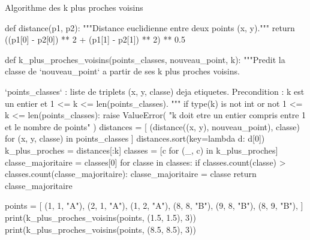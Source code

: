 \begin{codereference}{Algorithme des k plus proches voisins}
\begin{python}
def distance(p1, p2):
    """Distance euclidienne entre deux points (x, y)."""
    return ((p1[0] - p2[0]) ** 2 + (p1[1] - p2[1]) ** 2) ** 0.5


def k_plus_proches_voisins(points_classes, nouveau_point, k):
    """Predit la classe de `nouveau_point` a partir de ses k plus proches voisins.

    `points_classes` : liste de triplets (x, y, classe) deja etiquetes.
    Precondition : k est un entier et 1 <= k <= len(points_classes).
    """
    if type(k) is not int or not 1 <= k <= len(points_classes):
        raise ValueError(
            "k doit etre un entier compris entre 1 et le nombre de points"
        )
    distances = [
        (distance((x, y), nouveau_point), classe)
        for (x, y, classe) in points_classes
    ]
    distances.sort(key=lambda d: d[0])
    k_plus_proches = distances[:k]
    classes = [c for (_, c) in k_plus_proches]
    classe_majoritaire = classes[0]
    for classe in classes:
        if classes.count(classe) > classes.count(classe_majoritaire):
            classe_majoritaire = classe
    return classe_majoritaire


points = [
    (1, 1, "A"), (2, 1, "A"), (1, 2, "A"),
    (8, 8, "B"), (9, 8, "B"), (8, 9, "B"),
]
print(k_plus_proches_voisins(points, (1.5, 1.5), 3))
print(k_plus_proches_voisins(points, (8.5, 8.5), 3))
\end{python}
\end{codereference}


